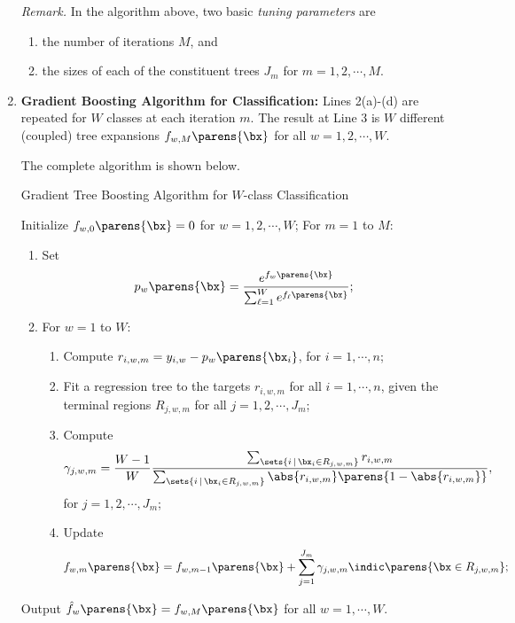 \documentclass[12pt]{article}
\begin{document}
\begin{enumerate}[label=\textbf{\arabic*.}]
	\vspace{10pt}
	
	\textit{Remark.} In the algorithm above, two basic \textit{tuning parameters} are 
	\begin{enumerate}
		\item the number of iterations $M$, and 
		\item the sizes of each of the constituent trees $J_m$ for $m = 1, 2, \cdots, M$. 
	\end{enumerate}
	
	\item \textbf{Gradient Boosting Algorithm for Classification:} Lines 2(a)-(d) are repeated for $W$ classes at each iteration $m$. The result at Line 3 is $W$ different (coupled) tree expansions $f_{w,M} \parens{\bx}$ for all $w = 1, 2, \cdots, W$. 
	
	The complete algorithm is shown below. 
	
	\begin{minipage}{\linewidth}
		\begin{algorithm}[H]
		\caption{Gradient Tree Boosting Algorithm for $W$-class Classification}\label{algo-gradient-boosting-classification}
		\begin{algorithmic}[1]
			\STATE Initialize $f_{w,0} \parens{\bx} = 0$ for $w = 1, 2, \cdots, W$; 
			\STATE For $m = 1$ to $M$: 
			\begin{enumerate}
				\item Set 
				\begin{align*}
					p_{w} \parens{\bx} = \frac{e^{f_w \parens{\bx}}}{\sum_{\ell=1}^W e^{f_{\ell} \parens{\bx}}}; 
				\end{align*}
				\item For $w=1$ to $W$: 
				\begin{enumerate}
					\item Compute $r_{i,w,m} = y_{i,w} - p_w \parens{\bx_i}$, for $i = 1, \cdots, n$; 
					\item Fit a regression tree to the targets $r_{i,w,m}$ for all $i = 1, \cdots, n$, given the terminal regions $R_{j,w,m}$ for all $j = 1, 2, \cdots, J_m$; 
					\item Compute 
					\begin{align*}
						\gamma_{j,w,m} = \frac{W-1}{W} \frac{\sum_{\sets{i \,\vert\, \bx_i \in R_{j,w,m}}} r_{i,w,m}}{\sum_{\sets{i \,\vert\, \bx_i \in R_{j,w,m}}} \abs{r_{i,w,m}} \parens{1 - \abs{r_{i,w,m}}}}, 
					\end{align*}
					for $j = 1, 2, \cdots, J_m$; 
					\item Update 
					\begin{align*}
						f_{w,m} \parens{\bx} = f_{w,m-1} \parens{\bx} + \sum_{j=1}^{J_m} \gamma_{j,w,m} \indic \parens{\bx \in R_{j,w,m}}; 
					\end{align*}
				\end{enumerate}
			\end{enumerate}
			\STATE Output $\hat{f}_w \parens{\bx} = f_{w,M} \parens{\bx}$ for all $w = 1, \cdots, W$. 
		\end{algorithmic}
		\end{algorithm}
	\end{minipage}


\end{enumerate}
\end{document}
